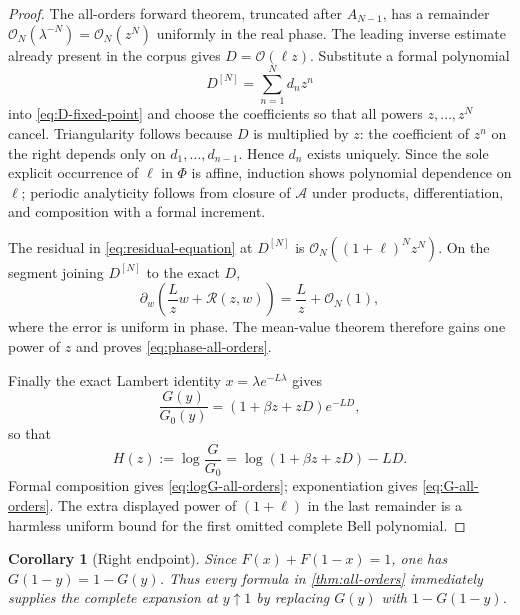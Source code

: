\documentclass[11pt,oneside]{article}
\numberwithin{equation}{section}
\newtheorem{corollary}[theorem]{Corollary}
\theoremstyle{definition}
\theoremstyle{remark}
\newcommand{\cO}{\mathcal O}
\newcommand{\Gzero}{G_0}
\begin{document}
\begin{proof}
The all-orders forward theorem, truncated after $A_{N-1}$, has a remainder $\cO_N(\lambda^{-N})=\cO_N(z^N)$ uniformly in the real phase.  The leading inverse estimate already present in the corpus gives $D=\cO(\ell z)$.  Substitute a formal polynomial
\begin{equation}
 D^{[N]}=\sum_{n=1}^{N}d_nz^n
 \label{eq:D-truncation}
\end{equation}
into \cref{eq:D-fixed-point} and choose the coefficients so that all powers $z,\ldots,z^N$ cancel.  Triangularity follows because $D$ is multiplied by $z$: the coefficient of $z^n$ on the right depends only on $d_1,\ldots,d_{n-1}$.  Hence $d_n$ exists uniquely.  Since the sole explicit occurrence of $\ell$ in $\Phi$ is affine, induction shows polynomial dependence on $\ell$; periodic analyticity follows from closure of $\mathscr A$ under products, differentiation, and composition with a formal increment.

The residual in \cref{eq:residual-equation} at $D^{[N]}$ is
$\cO_N((1+\ell)^Nz^N)$.  On the segment joining $D^{[N]}$ to the exact $D$,
\begin{equation}
 \partial_w\left(\frac Lzw+\mathcal R(z,w)\right)
 =\frac Lz+\cO_N(1),
 \label{eq:large-implicit-derivative}
\end{equation}
where the error is uniform in phase.  The mean-value theorem therefore gains one power of $z$ and proves \cref{eq:phase-all-orders}.

Finally the exact Lambert identity $x=\lambda e^{-L\lambda}$ gives
\begin{equation}
 \frac{G(y)}{\Gzero(y)}=(1+\beta z+zD)e^{-LD},
 \label{eq:ratio-exact}
\end{equation}
so that
\begin{equation}
 H(z):=\log\frac{G}{\Gzero}
 =\log(1+\beta z+zD)-LD.
 \label{eq:H-definition}
\end{equation}
Formal composition gives \cref{eq:logG-all-orders}; exponentiation gives
\cref{eq:G-all-orders}.  The extra displayed power of $(1+\ell)$ in the last remainder is a harmless uniform bound for the first omitted complete Bell polynomial.
\end{proof}

\begin{corollary}[Right endpoint]
\label{cor:right-endpoint}
Since $F(x)+F(1-x)=1$, one has $G(1-y)=1-G(y)$.  Thus every formula in \cref{thm:all-orders} immediately supplies the complete expansion at $y\uparrow1$ by replacing $G(y)$ with $1-G(1-y)$.
\end{corollary}
\end{document}
